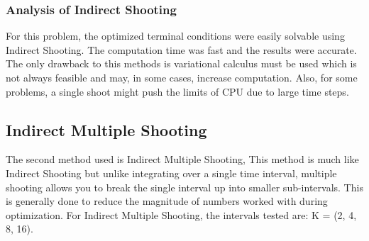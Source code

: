 \documentclass[]{article}
\begin{document}
\subsubsection{Analysis of Indirect Shooting}
For this problem, the optimized terminal conditions were easily solvable using Indirect Shooting. The computation time was fast and the results were accurate. The only drawback to this methods is variational calculus must be used which is not always feasible and may, in some cases, increase computation. Also, for some problems, a single shoot might push the limits of CPU due to large time steps. 
\subsection{Indirect Multiple Shooting}
The second method used is Indirect Multiple Shooting, This method is much like Indirect Shooting but unlike integrating over a single time interval, multiple shooting allows you to break the single interval up into smaller sub-intervals. This is generally done to reduce the magnitude of numbers worked with during optimization. For Indirect Multiple Shooting, the intervals tested are: K = (2, 4, 8, 16).
\end{document}
